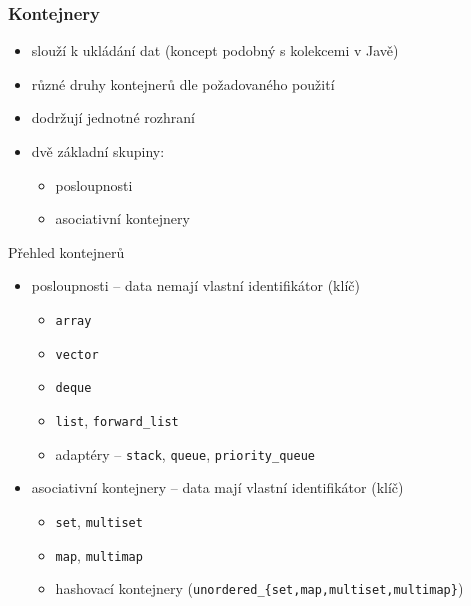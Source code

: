
\begin{frame}[fragile]
\frametitle{Kontejnery}

\begin{block}{}
\begin{itemize}
\item slouží k ukládání dat (koncept podobný s kolekcemi v Javě)
\item různé druhy kontejnerů dle požadovaného použití
\item dodržují jednotné rozhraní
\item dvě základní skupiny:
\begin{itemize}
\item posloupnosti
\item asociativní kontejnery
\end{itemize}
\end{itemize}
\end{block}
\end{frame}






\begin{frame}[fragile]
\begin{block}{Přehled kontejnerů}
\begin{itemize}
\item posloupnosti -- data nemají vlastní identifikátor (klíč)
\begin{itemize}
\item \lstinline|array|
\item \lstinline|vector|
\item \lstinline|deque|
\item \lstinline|list|, \lstinline|forward_list|
\item adaptéry -- \lstinline|stack|, \lstinline|queue|, \lstinline|priority_queue|
\end{itemize}
\item asociativní kontejnery -- data mají vlastní identifikátor (klíč)
\begin{itemize}
\item \lstinline|set|, \lstinline|multiset|
\item \lstinline|map|, \lstinline|multimap|
\item hashovací kontejnery (\lstinline|unordered_{set,map,multiset,multimap}|)
\end{itemize}
\end{itemize}
\end{block}
\end{frame}










